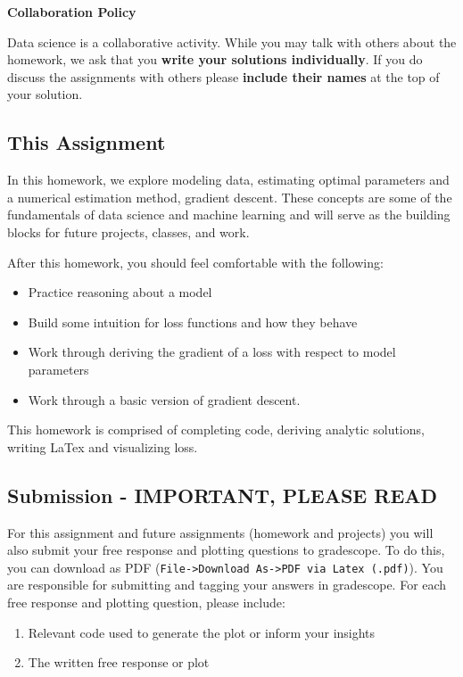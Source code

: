 \documentclass[11pt]{article}
\providecommand{\tightlist}{%
      \setlength{\itemsep}{0pt}\setlength{\parskip}{0pt}}
\begin{document}
\textbf{Collaboration Policy}

Data science is a collaborative activity. While you may talk with others
about the homework, we ask that you \textbf{write your solutions
individually}. If you do discuss the assignments with others please
\textbf{include their names} at the top of your solution.

\subsection{This Assignment}\label{this-assignment}

In this homework, we explore modeling data, estimating optimal
parameters and a numerical estimation method, gradient descent. These
concepts are some of the fundamentals of data science and machine
learning and will serve as the building blocks for future projects,
classes, and work.

After this homework, you should feel comfortable with the following:

\begin{itemize}
\item
  Practice reasoning about a model
\item
  Build some intuition for loss functions and how they behave
\item
  Work through deriving the gradient of a loss with respect to model
  parameters
\item
  Work through a basic version of gradient descent.
\end{itemize}

This homework is comprised of completing code, deriving analytic
solutions, writing LaTex and visualizing loss.

\subsection{Submission - IMPORTANT, PLEASE
READ}\label{submission---important-please-read}

For this assignment and future assignments (homework and projects) you
will also submit your free response and plotting questions to
gradescope. To do this, you can download as PDF
(\texttt{File-\textgreater{}Download\ As-\textgreater{}PDF\ via\ Latex\ (.pdf)}).
You are responsible for submitting and tagging your answers in
gradescope. For each free response and plotting question, please
include:

\begin{enumerate}
\def\labelenumi{\arabic{enumi}.}
\tightlist
\item
  Relevant code used to generate the plot or inform your insights
\item
  The written free response or plot
\end{enumerate}
\end{document}
